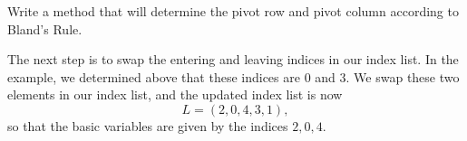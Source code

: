 \begin{problem}
Write a method that will determine the pivot row and pivot column according to Bland's Rule.

\label{prob:blands}
\end{problem}

The next step is to swap the entering and leaving indices in our index list.
In the example, we determined above that these indices are $0$ and $3$. We swap these two elements in our index list,
and the updated index list is now
\[
L = (2, 0, 4, 3, 1),
\]
so that the basic variables are given by the indices $2, 0, 4$.

